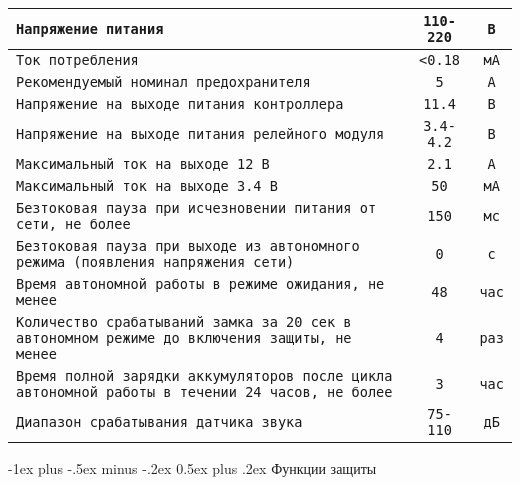 \documentclass[a4paper,10pt,landscape]{article}
\makeatletter
\renewcommand{\section}{\@startsection{section}{1}{0mm}%
                                {-1ex plus -.5ex minus -.2ex}%
                                {0.5ex plus .2ex}%
                                {\normalfont\large\bfseries}}
\makeatother
\begin{document}
\begin{multicols}{3}
\noindent\begin{tabular}{p{6cm}|p{2cm}|p{2cm}}
\hline
\texttt{Напряжение питания}&\multicolumn{1}{c}{\texttt{110-220}}&\multicolumn{1}{c}{\texttt{В}}\\
\hline
\texttt{Ток потребления}&\multicolumn{1}{c}{\texttt{<0.18}}&\multicolumn{1}{c}{\texttt{мА}}\\
\hline
\texttt{Рекомендуемый номинал предохранителя}&\multicolumn{1}{c}{\texttt{5}}&\multicolumn{1}{c}{\texttt{А}}\\
\hline
\texttt{Напряжение на выходе питания контроллера}&\multicolumn{1}{c}{\texttt{11.4}}&\multicolumn{1}{c}{\texttt{В}}\\
\hline
\texttt{Напряжение на выходе питания релейного модуля}&\multicolumn{1}{c}{\texttt{3.4-4.2}}&\multicolumn{1}{c}{\texttt{В}}\\
\hline
\texttt{Максимальный ток на выходе 12 В}&\multicolumn{1}{c}{\texttt{2.1}}&\multicolumn{1}{c}{\texttt{А}}\\
\hline
\texttt{Максимальный ток на выходе 3.4 В}&\multicolumn{1}{c}{\texttt{50}}&\multicolumn{1}{c}{\texttt{мА}}\\
\hline
\texttt{Безтоковая пауза при исчезновении питания от сети, не более}&\multicolumn{1}{c}{\texttt{150}}&\multicolumn{1}{c}{\texttt{мс}}\\
\hline
\texttt{Безтоковая пауза при выходе из автономного режима (появления напряжения сети)}&\multicolumn{1}{c}{\texttt{0}}&\multicolumn{1}{c}{\texttt{с}}\\
\hline
\texttt{Время автономной работы в режиме ожидания, не менее}&\multicolumn{1}{c}{\texttt{48}}&\multicolumn{1}{c}{\texttt{час}}\\
\hline
\texttt{Количество срабатываний замка за 20 сек в автономном режиме до включения защиты, не менее}&\multicolumn{1}{c}{\texttt{4}}&\multicolumn{1}{c}{\texttt{раз}}\\
\hline
\texttt{Время полной зарядки аккумуляторов после цикла автономной работы в течении 24 часов, не более}&\multicolumn{1}{c}{\texttt{3}}&\multicolumn{1}{c}{\texttt{час}}\\
\hline
\texttt{Диапазон срабатывания датчика звука}&\multicolumn{1}{c}{\texttt{75-110}}&\multicolumn{1}{c}{\texttt{дБ}}\\
\hline
\end{tabular}

\section{Функции защиты}


\end{multicols}
\end{document}

